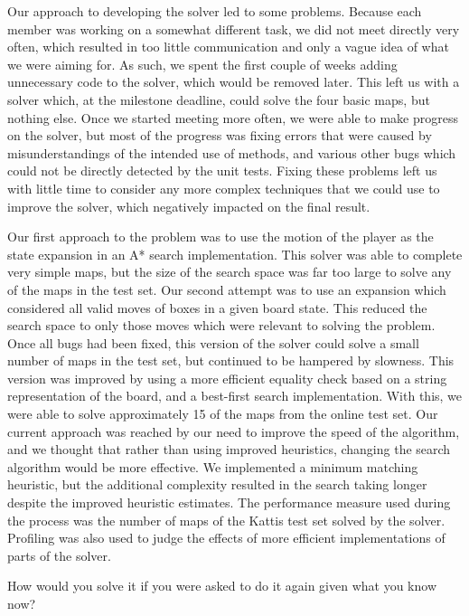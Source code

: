 \documentclass[a4paper,11pt]{article}
\begin{document}
Our approach to developing the solver led to some problems. Because each member
was working on a somewhat different task, we did not meet directly very often,
which resulted in too little communication and only a vague idea of what we were
aiming for. As such, we spent the first couple of weeks adding unnecessary code
to the solver, which would be removed later. This left us with a solver which,
at the milestone deadline, could solve the four basic maps, but nothing
else. Once we started meeting more often, we were able to make progress on the
solver, but most of the progress was fixing errors that were caused by
misunderstandings of the intended use of methods, and various other bugs which
could not be directly detected by the unit tests. Fixing these problems left us
with little time to consider any more complex techniques that we could use to
improve the solver, which negatively impacted on the final result.

Our first approach to the problem was to use the motion of the player as the
state expansion in an A* search implementation. This solver was able to complete
very simple maps, but the size of the search space was far too large to solve
any of the maps in the test set. Our second attempt was to use an expansion
which considered all valid moves of boxes in a given board state. This reduced
the search space to only those moves which were relevant to solving the
problem. Once all bugs had been fixed, this version of the solver could solve a
small number of maps in the test set, but continued to be hampered by
slowness. This version was improved by using a more efficient equality check
based on a string representation of the board, and a best-first search
implementation. With this, we were able to solve approximately 15 of the maps
from the online test set. Our current approach was reached by our need to
improve the speed of the algorithm, and we thought that rather than using
improved heuristics, changing the search algorithm would be more effective. We
implemented a minimum matching heuristic, but the additional complexity resulted
in the search taking longer despite the improved heuristic estimates. The
performance measure used during the process was the number of maps of the Kattis
test set solved by the solver. Profiling was also used to judge the effects of
more efficient implementations of parts of the solver.

How would you solve it if you were asked to do it again given what you know now?

\printbibliography
\end{document}
